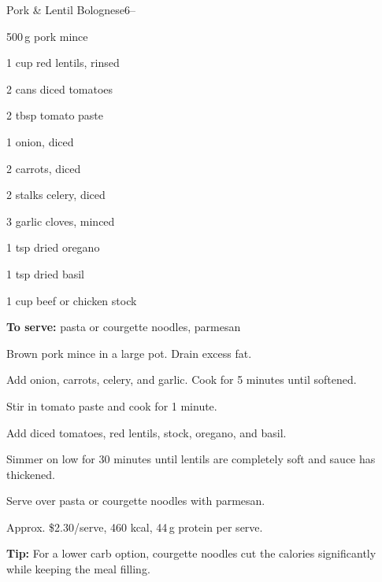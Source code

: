 \begin{recipebox}{Pork \& Lentil Bolognese}{6}{--}
\begin{ingredients}
  \item 500\,g pork mince
  \item 1 cup red lentils, rinsed
  \item 2 cans diced tomatoes
  \item 2 tbsp tomato paste
  \item 1 onion, diced
  \item 2 carrots, diced
  \item 2 stalks celery, diced
  \item 3 garlic cloves, minced
  \item 1 tsp dried oregano
  \item 1 tsp dried basil
  \item 1 cup beef or chicken stock
  \item \textbf{To serve:} pasta or courgette noodles, parmesan
\end{ingredients}

\begin{method}
  \item Brown pork mince in a large pot. Drain excess fat.
  \item Add onion, carrots, celery, and garlic. Cook for 5 minutes until softened.
  \item Stir in tomato paste and cook for 1 minute.
  \item Add diced tomatoes, red lentils, stock, oregano, and basil.
  \item Simmer on low for 30 minutes until lentils are completely soft and sauce has thickened.
  \item Serve over pasta or courgette noodles with parmesan.
\end{method}

\begin{notelist}
  \item Approx. \$2.30/serve, 460 kcal, 44\,g protein per serve.
  \item \textbf{Tip:} For a lower carb option, courgette noodles cut the calories significantly while keeping the meal filling.
\end{notelist}
\end{recipebox}
